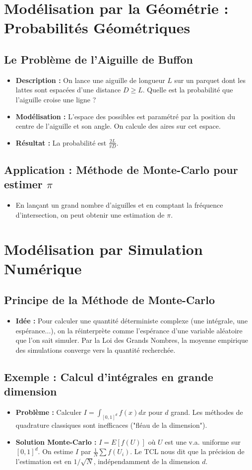 \documentclass[12pt, a4paper, parskip=full]{report}
\theoremstyle{agregstyle}
\begin{document}
\section{Modélisation par la Géométrie : Probabilités Géométriques}
\subsection{Le Problème de l'Aiguille de Buffon}
\begin{itemize}
    \item \textbf{Description :} On lance une aiguille de longueur $L$ sur un parquet dont les lattes sont espacées d'une distance $D \ge L$. Quelle est la probabilité que l'aiguille croise une ligne ?
    \item \textbf{Modélisation :} L'espace des possibles est paramétré par la position du centre de l'aiguille et son angle. On calcule des aires sur cet espace.
    \item \textbf{Résultat :} La probabilité est $\frac{2L}{\pi D}$.
\end{itemize}
\subsection{Application : Méthode de Monte-Carlo pour estimer $\pi$}
\begin{itemize}
    \item En lançant un grand nombre d'aiguilles et en comptant la fréquence d'intersection, on peut obtenir une estimation de $\pi$.
\end{itemize}

\section{Modélisation par Simulation Numérique}
\subsection{Principe de la Méthode de Monte-Carlo}
\begin{itemize}
    \item \textbf{Idée :} Pour calculer une quantité déterministe complexe (une intégrale, une espérance...), on la réinterprète comme l'espérance d'une variable aléatoire que l'on sait simuler. Par la Loi des Grands Nombres, la moyenne empirique des simulations converge vers la quantité recherchée.
\end{itemize}
\subsection{Exemple : Calcul d'intégrales en grande dimension}
\begin{itemize}
    \item \textbf{Problème :} Calculer $I = \int_{[0,1]^d} f(x) dx$ pour $d$ grand. Les méthodes de quadrature classiques sont inefficaces ("fléau de la dimension").
    \item \textbf{Solution Monte-Carlo :} $I = E[f(U)]$ où $U$ est une v.a. uniforme sur $[0,1]^d$. On estime $I$ par $\frac{1}{N} \sum f(U_i)$. Le TCL nous dit que la précision de l'estimation est en $1/\sqrt{N}$, indépendamment de la dimension $d$.
\end{itemize}
\end{document}
